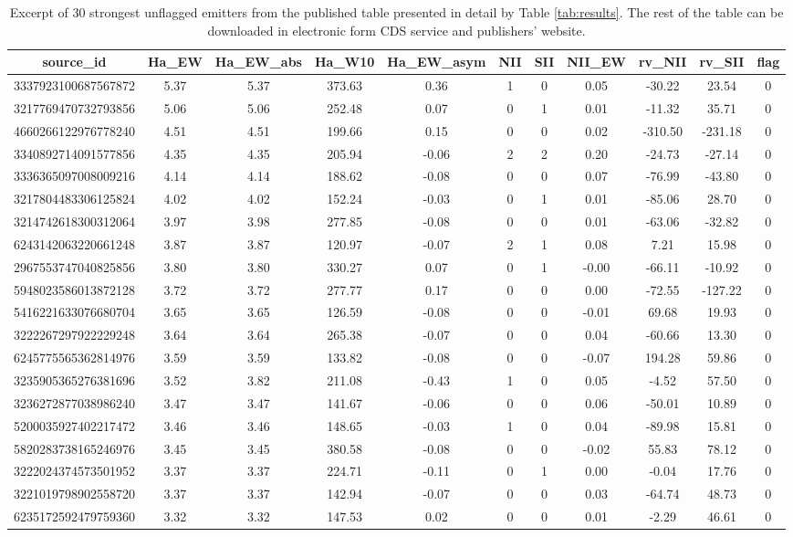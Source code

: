 \begin{table}
	\centering
	\caption{Excerpt of 30 strongest unflagged emitters from the published table presented in detail by Table \ref{tab:results}. The rest of the table can be downloaded in electronic form CDS service and publishers' website.}
	\label{tab:results_values}
	\begin{tabular}{c | c | c | c | c | c | c | c | c | c | c}
		\hline
		source\_id & Ha\_EW & Ha\_EW\_abs & Ha\_W10 & Ha\_EW\_asym & NII & SII & NII\_EW & rv\_NII & rv\_SII & flag \\
		\hline
		3337923100687567872 & 5.37 & 5.37 & 373.63 & 0.36 & 1 & 0 & 0.05 & -30.22 & 23.54 & 0 \\
		3217769470732793856 & 5.06 & 5.06 & 252.48 & 0.07 & 0 & 1 & 0.01 & -11.32 & 35.71 & 0 \\
		4660266122976778240 & 4.51 & 4.51 & 199.66 & 0.15 & 0 & 0 & 0.02 & -310.50 & -231.18 & 0 \\
		3340892714091577856 & 4.35 & 4.35 & 205.94 & -0.06 & 2 & 2 & 0.20 & -24.73 & -27.14 & 0 \\
		3336365097008009216 & 4.14 & 4.14 & 188.62 & -0.08 & 0 & 0 & 0.07 & -76.99 & -43.80 & 0 \\
		3217804483306125824 & 4.02 & 4.02 & 152.24 & -0.03 & 0 & 1 & 0.01 & -85.06 & 28.70 & 0 \\
		3214742618300312064 & 3.97 & 3.98 & 277.85 & -0.08 & 0 & 0 & 0.01 & -63.06 & -32.82 & 0 \\
		6243142063220661248 & 3.87 & 3.87 & 120.97 & -0.07 & 2 & 1 & 0.08 & 7.21 & 15.98 & 0 \\
		2967553747040825856 & 3.80 & 3.80 & 330.27 & 0.07 & 0 & 1 & -0.00 & -66.11 & -10.92 & 0 \\
		5948023586013872128 & 3.72 & 3.72 & 277.77 & 0.17 & 0 & 0 & 0.00 & -72.55 & -127.22 & 0 \\
		5416221633076680704 & 3.65 & 3.65 & 126.59 & -0.08 & 0 & 0 & -0.01 & 69.68 & 19.93 & 0 \\
		3222267297922229248 & 3.64 & 3.64 & 265.38 & -0.07 & 0 & 0 & 0.04 & -60.66 & 13.30 & 0 \\
		6245775565362814976 & 3.59 & 3.59 & 133.82 & -0.08 & 0 & 0 & -0.07 & 194.28 & 59.86 & 0 \\
		3235905365276381696 & 3.52 & 3.82 & 211.08 & -0.43 & 1 & 0 & 0.05 & -4.52 & 57.50 & 0 \\
		3236272877038986240 & 3.47 & 3.47 & 141.67 & -0.06 & 0 & 0 & 0.06 & -50.01 & 10.89 & 0 \\
		5200035927402217472 & 3.46 & 3.46 & 148.65 & -0.03 & 1 & 0 & 0.04 & -89.98 & 15.81 & 0 \\
		5820283738165246976 & 3.45 & 3.45 & 380.58 & -0.08 & 0 & 0 & -0.02 & 55.83 & 78.12 & 0 \\
		3222024374573501952 & 3.37 & 3.37 & 224.71 & -0.11 & 0 & 1 & 0.00 & -0.04 & 17.76 & 0 \\
		3221019798902558720 & 3.37 & 3.37 & 142.94 & -0.07 & 0 & 0 & 0.03 & -64.74 & 48.73 & 0 \\
		6235172592479759360 & 3.32 & 3.32 & 147.53 & 0.02 & 0 & 0 & 0.01 & -2.29 & 46.61 & 0 \\
		\hline
	\end{tabular}
\end{table}
